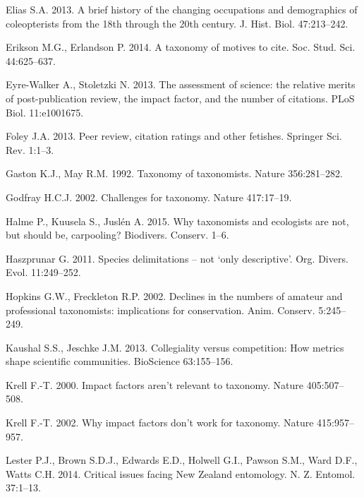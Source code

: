 \documentclass[webpdf,PV,mynatbib,surname,CE,MSC]{SYS-PV}
\begin{document}
\begin{thebibliography}{}
Elias S.A. 2013. A brief history of the changing occupations and demographics of coleopterists
from the 18th through the 20th century. J. Hist. Biol. 47:213--242.

Erikson M.G., Erlandson P. 2014. A taxonomy of motives to cite. Soc. Stud. Sci. 44:625--637.

Eyre-Walker A., Stoletzki N. 2013. The assessment of science: the relative merits of
post-publication review, the impact factor, and the number of citations. PLoS Biol. 11:e1001675.

Foley J.A. 2013. Peer review, citation ratings and other fetishes. Springer Sci. Rev. 1:1--3.

Gaston K.J., May R.M. 1992. Taxonomy of taxonomists. Nature 356:281--282.

Godfray H.C.J. 2002. Challenges for taxonomy. Nature 417:17--19.

Halme P., Kuusela S., Jusl\'{e}n A. 2015. Why taxonomists and ecologists are not, but should be,
carpooling? Biodivers. Conserv. 1--6.

Haszprunar G. 2011. Species delimitations -- not `only descriptive'. Org. Divers. Evol.
11:249--252.

Hopkins G.W., Freckleton R.P. 2002. Declines in the numbers of amateur and professional
taxonomists: implications for conservation. Anim. Conserv. 5:245--249.

Kaushal S.S., Jeschke J.M. 2013. Collegiality versus competition: How metrics shape scientific
communities. BioScience 63:155--156.

Krell F.-T. 2000. Impact factors aren't relevant to taxonomy. Nature 405:507--508.

Krell F.-T. 2002. Why impact factors don't work for taxonomy. Nature 415:957--957.

Lester P.J., Brown S.D.J., Edwards E.D., Holwell G.I., Pawson S.M., Ward D.F., Watts C.H. 2014.
Critical issues facing New Zealand entomology. N. Z. Entomol. 37:1--13.


\end{thebibliography}
\end{document}
